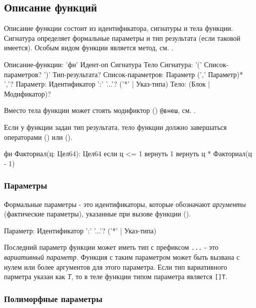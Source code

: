 \hypertarget{functions}{%
\subsection{Описание функций}\label{decls:functions}}

Описание функции состоит из идентификатора, сигнатуры  и тела функции. 
Сигнатура определяет формальные параметры и тип результата (если таковой имеется). 
Особым видом функции является метод, см. .

\begin{Grammar}
Описание-функции: 'фн' Идент-оп Сигнатура Тело
Сигнатура: '(' Список-параметров? ')' Тип-результата?
Список-параметров: Параметр (',' Параметр)* ','?
Параметр: Идентификатор ':' '...'? ('*' | Указ-типа)  
Тело: (Блок | Модификатор)?
\end{Grammar} 

Вместо тела функции может стоять модификтор () \verb|@внеш|, см. .

Если у функции задан тип результата, тело функции должно завершаться операторами  () или  ().

\begin{Trivil}
фн Факториал(ц: Цел64): Цел64 {
    если ц <= 1 { вернуть 1 }
    вернуть ц * Факториал(ц - 1)
}
\end{Trivil}

\hypertarget{params}{%
\subsubsection{Параметры}\label{decls:params}}

Формальные параметры - это идентификаторы, которые обозначают \emph{аргументы} (фактические параметры), указанные при вызове функции ().

\begin{Grammar}
Параметр: Идентификатор ':' '...'? ('*' | Указ-типа)  
\end{Grammar} 

Последний параметр функции может иметь тип с префиксом \verb|...| - это \emph{вариативный параметр}. Функция с таким параметром может быть вызвана с нулем или более аргументов для этого параметра. Если тип вариативного парметра указан как \emph{Т}, то в теле функции типом  параметра является \verb+[]T+.

\hypertarget{params-poly}{%
\subsubsection{Полиморфные параметры}\label{decls:params-poly}}

